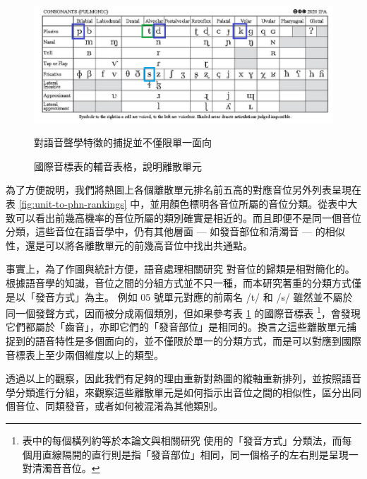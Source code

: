\begin{figure}
    \centering
    \includegraphics[width=1\linewidth]{figures/ipa_similarity.png}
    \caption[]{
國際音標表的輔音表格，說明離散單元}
                                                                對語音聲學特徵的捕捉並不僅限單一面向
    \label{fig:ipa-cons-table-sim}
\end{figure}

        為了方便說明，我們將熱圖上各個離散單元排名前五高的對應音位另外列表呈現在表 \ref{fig:unit-to-phn-rankings} 中，並用顏色標明各音位所屬的音位分類。從表中大致可以看出前幾高機率的音位所屬的類別確實是相近的。而且即便不是同一個音位分類，這些音位在語音學中，仍有其他層面 --- 如發音部位和清濁音 --- 的相似性，還是可以將各離散單元的前幾高音位中找出共通點。

        事實上，為了作圖與統計方便，語音處理相關研究 \cite{10097097, abdullah23_interspeech} 對音位的歸類是相對簡化的。根據語音學的知識，音位之間的分組方式並不只一種，而本研究著重的分類方式僅是以「發音方式」為主。
例如 05 號單元對應的前兩名 /t/ 和 /s/ 雖然並不屬於同一個發聲方式，因而被分成兩個類別，但如果參考表 \ref{fig:ipa-cons-table-sim} 的國際音標表 \footnote{表中的每個橫列約等於本論文與相關研究\cite{10097097, abdullah23_interspeech} 使用的「發音方式」分類法，而每個用直線隔開的直行則是指「發音部位」相同，同一個格子的左右則是呈現一對清濁音音位。}，會發現它們都屬於「齒音」，亦即它們的「發音部位」是相同的。換言之這些離散單元捕捉到的語音特性是多個面向的，並不僅限於單一的分類方式，而是可以對應到國際音標表上至少兩個維度以上的類型。

        透過以上的觀察，因此我們有足夠的理由重新對熱圖的縱軸重新排列，並按照語音學分類進行分組，來觀察這些離散單元是如何指示出音位之間的相似性，區分出同個音位、同類發音，或者如何被混淆為其他類別。  

